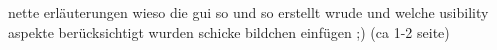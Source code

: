 
nette erläuterungen wieso die gui so und so erstellt wrude und welche usibility
aspekte berücksichtigt wurden \newline
schicke bildchen einfügen ;) (ca 1-2 seite)